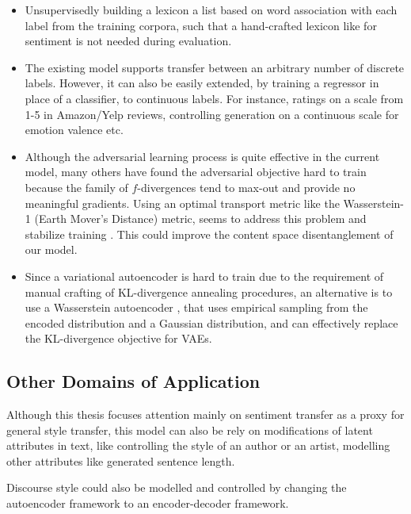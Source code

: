 \begin{itemize}
	\item Unsupervisedly building a lexicon a list based on word association with each label from the training corpora, such that a hand-crafted lexicon like \cite{hu2004mining} for sentiment is not needed during evaluation.
	\item The existing model supports transfer between an arbitrary number of discrete labels. However, it can also be easily extended, by training a regressor in place of a classifier, to continuous labels. For instance, ratings on a scale from 1-5 in Amazon/Yelp reviews, controlling generation on a continuous scale for emotion valence etc.
	\item Although the adversarial learning process is quite effective in the current model, many others have found the adversarial objective hard to train because the family of $f$-divergences tend to max-out and provide no meaningful gradients. Using an optimal transport metric like the Wasserstein-1 (Earth Mover's Distance) metric, seems to address this problem and stabilize training \citep{arjovsky2017wasserstein, gulrajani2017improved}. This could improve the content space disentanglement of our model.
	\item Since a variational autoencoder is hard to train due to the requirement of manual crafting of KL-divergence annealing procedures, an alternative is to use a Wasserstein autoencoder \citep{tolstikhin2017wasserstein}, that uses empirical sampling from the encoded distribution and a Gaussian distribution, and can effectively replace the KL-divergence objective for VAEs.
\end{itemize}


\subsection{Other Domains of Application}

Although this thesis focuses attention mainly on sentiment transfer as a proxy for general style transfer, this model can also be  rely on modifications of latent attributes in text, like controlling the style of an author or an artist, modelling other attributes like generated sentence length.

Discourse style could also be modelled and controlled by changing the autoencoder framework to an encoder-decoder framework.
